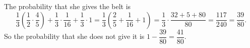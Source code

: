 The probability that she gives the belt is
\[\dfrac13\left(\dfrac12\cdot\dfrac45\right)+\dfrac13\cdot\dfrac1{16}+\dfrac13\cdot1=\dfrac13\left(\dfrac25+\dfrac1{16}+1\right)=\dfrac13\cdot\dfrac{32+5+80}{80}=\dfrac{117}{240}=\dfrac{39}{80}.\]
So the probability that she does not give it is $1-\dfrac{39}{80}=\boxed{\dfrac{41}{80}}$.
